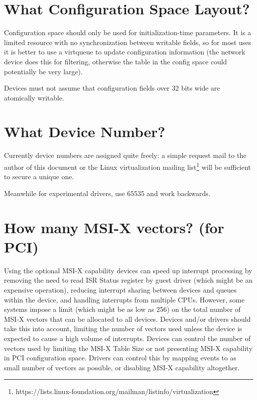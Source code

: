 \section{What Configuration Space Layout?}\label{sec:Creating New Device Types / What Configuration Space Layout?}

Configuration space should only be used for initialization-time
parameters.  It is a limited resource with no synchronization between
writable fields, so for most uses it is better to use a virtqueue to update
configuration information (the network device does this for filtering,
otherwise the table in the config space could potentially be very
large).

Devices must not assume that configuration fields over 32 bits wide
are atomically writable.

\section{What Device Number?}\label{sec:Creating New Device Types / What Device Number?}

Currently device numbers are assigned quite freely: a simple
request mail to the author of this document or the Linux
virtualization mailing list\footnote{https://lists.linux-foundation.org/mailman/listinfo/virtualization
} will be sufficient to secure a unique one.

Meanwhile for experimental drivers, use 65535 and work backwards.

\section{How many MSI-X vectors?  (for PCI)}\label{sec:Creating New Device Types / How many MSI-X vectors?  (for PCI)}

Using the optional MSI-X capability devices can speed up
interrupt processing by removing the need to read ISR Status
register by guest driver (which might be an expensive operation),
reducing interrupt sharing between devices and queues within the
device, and handling interrupts from multiple CPUs. However, some
systems impose a limit (which might be as low as 256) on the
total number of MSI-X vectors that can be allocated to all
devices. Devices and/or drivers should take this into
account, limiting the number of vectors used unless the device is
expected to cause a high volume of interrupts. Devices can
control the number of vectors used by limiting the MSI-X Table
Size or not presenting MSI-X capability in PCI configuration
space. Drivers can control this by mapping events to as small
number of vectors as possible, or disabling MSI-X capability
altogether.


